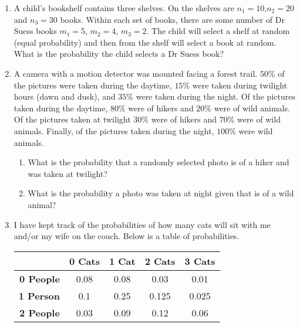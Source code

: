\documentclass[]{book}
\providecommand{\tightlist}{%
  \setlength{\itemsep}{0pt}\setlength{\parskip}{0pt}}
\begin{document}
\begin{enumerate}
\def\labelenumi{\arabic{enumi}.}
\setcounter{enumi}{8}
\item
  A child's bookshelf contains three shelves. On the shelves are
  \(n_1=10\),\(n_2=20\) and \(n_3=30\) books. Within each set of books,
  there are some number of Dr Suess books \(m_1=5\), \(m_2=4\),
  \(m_3=2\). The child will select a shelf at random (equal probability)
  and then from the shelf will select a book at random. What is the
  probability the child selects a Dr Suess book?
\item
  A camera with a motion detector was mounted facing a forest trail.
  \(50\%\) of the pictures were taken during the daytime, \(15\%\) were
  taken during twilight hours (dawn and dusk), and \(35\%\) were taken
  during the night. Of the pictures taken during the daytime, \(80\%\)
  were of hikers and \(20\%\) were of wild animals. Of the pictures
  taken at twilight \(30\%\) were of hikers and \(70\%\) were of wild
  animals. Finally, of the pictures taken during the night, \(100\%\)
  were wild animals.

  \begin{enumerate}
  \def\labelenumii{\alph{enumii})}
  \tightlist
  \item
    What is the probability that a randomly selected photo is of a hiker
    and was taken at twilight?
  \item
    What is the probability a photo was taken at night given that is of
    a wild animal?
  \end{enumerate}
\item
  I have kept track of the probabilities of how many cats will sit with
  me and/or my wife on the couch. Below is a table of probabilities.

  \begin{longtable}[]{@{}rcccc@{}}
  \toprule
  & 0 Cats & 1 Cat & 2 Cats & 3 Cats\tabularnewline
  \midrule
  \endhead
  \textbf{0 People} & 0.08 & 0.08 & 0.03 & 0.01\tabularnewline
  \textbf{1 Person} & 0.1 & 0.25 & 0.125 & 0.025\tabularnewline
  \textbf{2 People} & 0.03 & 0.09 & 0.12 & 0.06\tabularnewline
  \bottomrule
  \end{longtable}


\end{enumerate}
\end{document}
